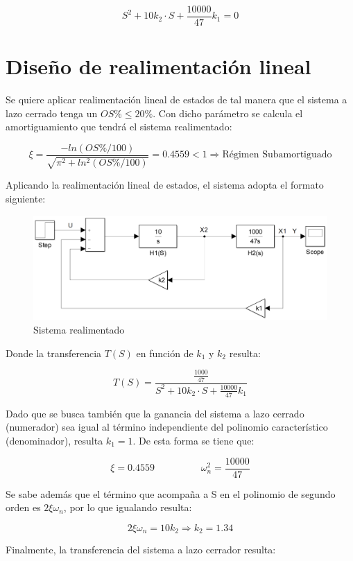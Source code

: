 \documentclass{article}
\begin{document}
\[
S^2 + 10k_2 \cdot S + \frac{10000}{47}k_1 = 0
\]

\newpage
\section{Diseño de realimentación lineal}
Se quiere aplicar realimentación lineal de estados de tal manera que el sistema a lazo cerrado tenga un $OS\% \leq 20\%$. Con dicho parámetro se calcula el amortiguamiento que tendrá el sistema realimentado:

\[
\xi = \frac{-ln(OS\% / 100)}{\sqrt{\pi^2 + ln^2(OS\% / 100)}} = 0.4559 < 1 \Longrightarrow \textrm{Régimen Subamortiguado}
\]



Aplicando la realimentación lineal de estados, el sistema adopta el formato siguiente:

\begin{figure}[H]
\centering
\includegraphics[width=0.9\linewidth]{Imagenes/HLazoCerrado.png}
\caption{Sistema realimentado}
\label{fig:diagramaClose}
\end{figure}

Donde la transferencia $T(S)$ en función de $k_1$ y $k_2$ resulta:

\[
T(S) = \frac{\frac{1000}{47}}{S^2 + 10k_2 \cdot S + \frac{10000}{47}k_1}
\]

Dado que se busca también que la ganancia del sistema a lazo cerrado (numerador) sea igual al término independiente del polinomio característico (denominador), resulta $k_1 = 1$. De esta forma se tiene que:

\[
\xi = 0.4559 \hspace{2cm} \omega_n^2 = \frac{10000}{47}
\]

Se sabe además que el término que acompaña a S en el polinomio de segundo orden es $2 \xi \omega_n$, por lo que igualando resulta:

\[
2 \xi \omega_n = 10k_2 \Longrightarrow k_2 = 1.34
\]

Finalmente, la transferencia del sistema a lazo cerrador resulta:
\end{document}
